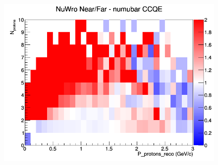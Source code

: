 \begin{figure}[h]
\endminipage
{}
\includegraphics[width=\linewidth]{eff_N_P/GAr/protons/ratios/CCQE_NuWro_numubar_NF_N_P.png}
\endminipage
\newline
\end{figure}
\clearpage
